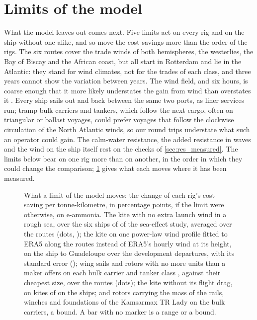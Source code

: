 \section{Limits of the model}
\label{sec:discussion}

What the model leaves out comes next. Five limits act on every rig and on the ship without one alike, and so move the cost savings more than the order of the rigs. The six routes cover the trade winds of both hemispheres, the westerlies, the Bay of Biscay and the African coast, but all start in Rotterdam and lie in the Atlantic: they stand for wind climates, not for the trades of each class, and three years cannot show the variation between years. The wind field,  and six hours, is coarse enough that it more likely understates the gain from wind than overstates it \citep{wendling2025}. Every ship sails out and back between the same two ports, as liner services run; tramp bulk carriers and tankers, which follow the next cargo, often on triangular or ballast voyages, could prefer voyages that follow the clockwise circulation of the North Atlantic winds, so our round trips understate what such an operator could gain. The calm-water resistance, the added resistance in waves and the wind on the ship itself rest on the checks of \cref{sec:res_measured}. The limits below bear on one rig more than on another, in the order in which they could change the comparison; \cref{fig:model_limits} gives what each moves where it has been measured.

\begin{figure}[tbp]
\centering
{}
\caption{  What a limit of the model moves: the change of each rig's cost saving per tonne-kilometre, in percentage points, if the limit were otherwise, on e-ammonia. The kite with no extra launch wind in a rough sea, over the six ships of  of the sea-effect study, averaged over the routes (dots, ); the kite on one power-law wind profile fitted to ERA5 along the routes instead of ERA5's hourly wind at its height, on the  ship to Guadeloupe over the development departures, with its standard error (); wing sails and rotors with no more units than a maker offers on each bulk carrier and tanker class \citep{anemoi2024brochure}, against their cheapest size, over the routes (dots); the kite without its flight drag, on kites of  on the  ships; and rotors carrying the mass of the rails, winches and foundations of the Kamsarmax TR Lady \citep{contopoulos2023} on the bulk carriers, a bound. A bar with no marker is a range or a bound.}
\label{fig:model_limits}
\end{figure}

